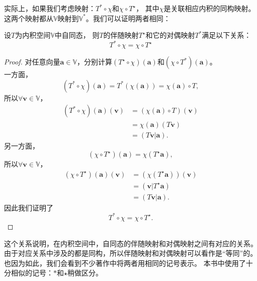 \documentclass[12pt,UTF8,fontset=none]{ctexbook}
\begin{document}
实际上，如果我们考虑映射：$T^* \circ \chi$和$\chi \circ T^\star$，
其中$\chi$是关联相应内积的同构映射。这两个映射都从$\mathbb{V}$映射到$\mathbb{V}^*$。我们可以证明两者相同：
\begin{pp}\label{pp:8_6}
    设$T$为内积空间$\mathbb{V}$中自同态，
    则$T$的伴随映射$T^\star$和它的对偶映射$T^*$满足以下关系：
    $$ T^* \circ \chi = \chi \circ T^\star $$
\end{pp}
\begin{proof} %
    对任意向量$\mathbf{a} \in \mathbb{V}$，分别计算$\left(T^\star \circ \chi\right)(\mathbf{a})$和$\left(\chi \circ T^*\right)(\mathbf{a})$。\\
    一方面，
    $$ \left(T^* \circ \chi\right)(\mathbf{a}) = T^* \left(\chi(\mathbf{a})\right) = \chi(\mathbf{a}) \circ T, $$
    所以$\forall \mathbf{v} \in \mathbb{V}$，
    \begin{align*}
        \left(T^* \circ \chi\right)(\mathbf{a})(\mathbf{v}) &= \left(\chi(\mathbf{a}) \circ T\right) (\mathbf{v})  \\
        &= \chi(\mathbf{a}) \left(T\mathbf{v} \right)  \\
        &= \left(T\mathbf{v} | \mathbf{a}\right). 
    \end{align*}
    另一方面，
    $$ \left(\chi \circ T^\star\right)(\mathbf{a}) = \chi \left(T^\star\mathbf{a}\right), $$
    所以$\forall \mathbf{v} \in \mathbb{V}$，
    \begin{align*}
        \left(\chi \circ T^\star\right)(\mathbf{a})(\mathbf{v}) &= \left(\chi \left(T^\star\mathbf{a}\right)\right) (\mathbf{v})  \\
        &= \left(\mathbf{v} | T^\star\mathbf{a}\right)  \\
        &= \left(T\mathbf{v} | \mathbf{a}\right). 
    \end{align*}
    因此我们证明了
    $$ T^* \circ \chi = \chi \circ T^\star. $$

\end{proof}

这个关系说明，在内积空间中，自同态的伴随映射和对偶映射之间有对应的关系。
由于对应关系中涉及的都是同构，所以伴随映射和对偶映射可以看作是“等同”的。
也因为如此，我们会看到不少著作中将两者用相同的记号表示。
本书中使用了十分相似的记号：$*$和$\star$稍做区分。
\end{document}
